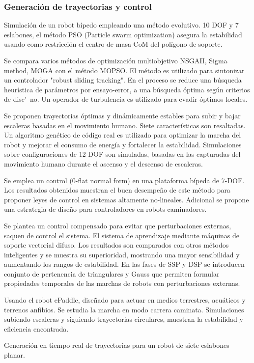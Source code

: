 \subsubsection[Gen. Tray. y Control]{Generaci\'on de trayectorias y control}
\label{sec:gentray}
Simulaci\'on de un robot b\'ipedo empleando una m\'etodo evolutivo. 10 DOF y 7 eslabones, el m\'etodo PSO (Particle swarm optimization) asegura la estabilidad usando como restricci\'on el centro de masa CoM del pol\'igono de soporte\cite{Kherici2014}.\par
Se compara varios m\'etodos de optimizaci\'on multiobjetivo NSGAII, Sigma method, MOGA con el m\'etodo MOPSO. El m\'etodo es utilizado para sintonizar un controlador "robust sliding tracking". En el proceso se reduce una b\'usqueda heur\'istica de parámetros por ensayo-error, a una b\'usqueda \'optima seg\'un criterios de dise\'~no. Un operador de turbulencia es utilizado para evadir \'optimos locales\cite{Mahmoodabadi2014}.\par
Se proponen trayectorias \'optimas y din\'amicamente estables para subir y bajar escaleras basadas en el movimiento humano. Siete caracter\'isticas son resaltadas. Un algoritmo gen\'etico de c\'odigo real es utilizado para optimizar la marcha del robot y mejorar el consumo de energ\'ia y fortalecer la estabilidad. Simulaciones sobre configuraciones de 12-DOF son simuladas, basadas en las capturadas del movimiento humano durante el ascenso y el descenso de escaleras\cite{Lim2014}.\par
Se emplea un control (0-flat normal form) en una plataforma b\'ipeda de 7-DOF. Los resultados obtenidos muestran el buen desempe\~no de este m\'etodo para proponer leyes de control en sistemas altamente no-lineales. Adicional se propone una estrategia de dise\~no para controladores en robots caminadores\cite{Bououden2014}.\par
Se plantea un control compensado para evitar que perturbaciones externas, saquen de control el sistema. El sistema de aprendizaje mediante m\'aquinas de soporte vectorial difuso. Los resultados son comparados con otros m\'etodos inteligentes y se muestra su superioridad, mostrando una mayor sensibilidad y aumentando los rangos de estabilidad. En las fases de SSP y DSP se introducen conjunto de pertenencia de  triangulares y Gauss que permiten formular propiedades temporales de las marchas de robots con perturbaciones externas\cite{Wang2013}.\par
Usando el robot ePaddle, dise\~nado para actuar en medios terrestres, acu\'aticos y terrenos anfibios. Se estudia la marcha en modo carrera caminata. Simulaciones subiendo escaleras y siguiendo trayectorias circulares, muestran la estabilidad y eficiencia encontrada\cite{Sun2013}.\par
Generaci\'on en tiempo real de trayectorias para un robot de siete eslabones planar\cite{Farzaneh2014}.\par

